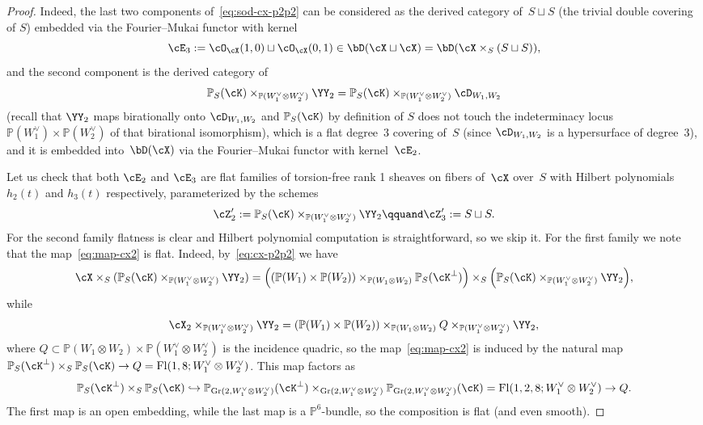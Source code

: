 \documentclass[11pt]{amsart}
\renewcommand{\P}{{\mathbb{P}}}
\DeclareMathOperator{\Gr}{\mathrm{Gr}}
\DeclareMathOperator{\Fl}{\mathrm{Fl}}
\theoremstyle{plain}
\theoremstyle{definition}
\theoremstyle{remark}
\begin{document}
\begin{proof}
Indeed, the last two components of~\eqref{eq:sod-cx-p2p2} can be considered as the derived category of~$S \sqcup S$ (the trivial double covering of $S$) embedded via the Fourier--Mukai functor with kernel
\begin{equation*}
\cE_3 := \cO_\cX(1,0) \sqcup \cO_\cX(0,1) \in \bD(\cX \sqcup \cX) = \bD(\cX \times_S (S \sqcup S)),
\end{equation*}
and the second component is the derived category of 
\begin{equation*}
\P_S(\cK) \times_{\P(W_1^\vee \otimes W_2^\vee)} \YY_2 = \P_S(\cK) \times_{\P(W_1^\vee \otimes W_2^\vee)} \cD_{W_1,W_2}
\end{equation*}
(recall that $\YY_2$ maps birationally onto $\cD_{W_1,W_2}$ and $\P_S(\cK)$ by definition of $S$ 
does not touch the indeterminacy locus $\P(W_1^\vee) \times \P(W_2^\vee)$ of that birational isomorphism),
which is a flat degree~3 covering of~$S$ (since $\cD_{W_1,W_2}$ is a hypersurface of degree~3), 
and it is embedded into~$\bD(\cX)$ via the Fourier--Mukai functor with kernel~$\cE_2$.

Let us check that both $\cE_2$ and $\cE_3$ are flat families of torsion-free rank 1 sheaves 
on fibers of~$\cX$ over~$S$ with Hilbert polynomials $h_2(t)$ and $h_3(t)$ respectively, parameterized by the schemes
\begin{equation*}
\cZ'_2 := \P_S(\cK) \times_{\P(W_1^\vee \otimes W_2^\vee)} \YY_2
\qquand
\cZ'_3 := S \sqcup S.
\end{equation*}
For the second family flatness is clear and Hilbert polynomial computation is straightforward, so we skip it.
For the first family we note that the map~\eqref{eq:map-cx2} is flat.
Indeed, by~\eqref{eq:cx-p2p2} we have
\begin{equation*}
\cX \times_S (\P_S(\cK) \times_{\P(W_1^\vee \otimes W_2^\vee)} \YY_2) =
\Big((\P(W_1) \times \P(W_2)) \times_{\P(W_1 \otimes W_2)} \P_S(\cK^\perp)\Big) \times_S \Big(\P_S(\cK) \times_{\P(W_1^\vee \otimes W_2^\vee)} \YY_2\Big),
\end{equation*}
while 
\begin{equation*}
\cX_2 \times_{\P(W_1^\vee \otimes W_2^\vee)} \YY_2 = 
(\P(W_1) \times \P(W_2)) \times_{\P(W_1 \otimes W_2)} Q \times_{\P(W_1^\vee \otimes W_2^\vee)} \YY_2,
\end{equation*}
where $Q \subset \P(W_1 \otimes W_2) \times \P(W_1^\vee \otimes W_2^\vee)$ is the incidence quadric, so the map~\eqref{eq:map-cx2} is induced 
by the natural map $\P_S(\cK^\perp) \times_S \P_S(\cK) \to Q = \Fl(1,8;W_1^\vee \otimes W_2^\vee)$.
This map factors as 
\begin{equation*}
\P_S(\cK^\perp) \times_S \P_S(\cK) \hookrightarrow 
\P_{\Gr(2,W_1^\vee \otimes W_2^\vee)}(\cK^\perp) \times_{\Gr(2,W_1^\vee \otimes W_2^\vee)} \P_{\Gr(2,W_1^\vee \otimes W_2^\vee)}(\cK) = 
\Fl(1,2,8;W_1^\vee \otimes W_2^\vee) \to Q.
\end{equation*}
The first map is an open embedding, while the last map is a $\P^6$-bundle, so the composition is flat (and even smooth).


\end{proof}
\end{document}
